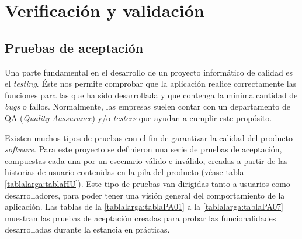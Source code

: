 \documentclass[pdftex,11pt,a4paper]{book}
\begin{document}

\chapter{Verificación y validación} \label{capitulo:verificacion-validacion}

\section{Pruebas de aceptación} \label{seccion:pruebas-aceptacion}

Una parte fundamental en el desarrollo de un proyecto informático de calidad es el \textit{testing}.  Éste nos permite comprobar que la aplicación realice correctamente las funciones para las que ha sido desarrollada y que contenga la mínima cantidad de \textit{bugs} o fallos. Normalmente, las empresas suelen contar con un departamento de QA (\textit{Quality Aassurance}) y/o \textit{testers} que ayudan a cumplir este propósito. 

Existen muchos tipos de pruebas con el fin de garantizar la calidad del producto \textit{software}. Para este proyecto se definieron una serie de pruebas de aceptación, compuestas cada una por un escenario válido e inválido, creadas a partir de las historias de usuario contenidas en la pila del producto (véase tabla \ref{tablalarga:tablaHU}). Este tipo de pruebas van dirigidas tanto a usuarios como desarrolladores, para poder tener una visión general del comportamiento de la aplicación. Las tablas de la \ref{tablalarga:tablaPA01} a la \ref{tablalarga:tablaPA07} muestran las pruebas de aceptación creadas para probar las funcionalidades desarrolladas durante la estancia en prácticas. 



\renewcommand{\tablename}{Tabla}
\renewcommand{\arraystretch}{1,7}
\end{document}
